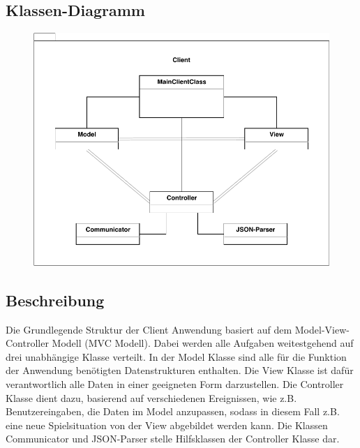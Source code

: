 \subsection{Klassen-Diagramm}
	\begin{figure}[H]
        \centering
        \includegraphics[scale=1]{images/Uebersicht.pdf}
    \end{figure}

\subsection{Beschreibung}
	Die Grundlegende Struktur der Client Anwendung basiert auf dem Model-View-Controller Modell (MVC Modell). Dabei werden alle Aufgaben weitestgehend auf drei unabhängige Klasse verteilt. In der Model Klasse sind alle für die Funktion der Anwendung benötigten Datenstrukturen enthalten. Die View Klasse ist dafür verantwortlich alle Daten in einer geeigneten Form darzustellen. Die Controller Klasse dient dazu, basierend auf verschiedenen Ereignissen, wie z.B. Benutzereingaben, die Daten im Model anzupassen, sodass in diesem Fall z.B. eine neue Spielsituation von der View abgebildet werden kann. Die Klassen Communicator und JSON-Parser stelle Hilfsklassen der Controller Klasse dar. 
		